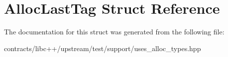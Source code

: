 \hypertarget{struct_alloc_last_tag}{}\section{Alloc\+Last\+Tag Struct Reference}
\label{struct_alloc_last_tag}


The documentation for this struct was generated from the following file\+:\begin{DoxyCompactItemize}
\item 
contracts/libc++/upstream/test/support/uses\+\_\+alloc\+\_\+types.\+hpp\end{DoxyCompactItemize}
